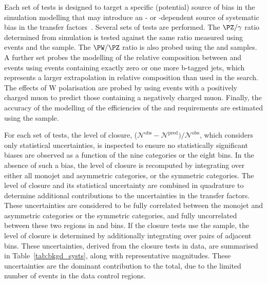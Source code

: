 Each set of tests is designed to target a specific (potential) source
of bias in the simulation modelling that may introduce an \njet- or
\scalht-dependent source of systematic bias in the transfer
factors~\cite{RA1Paper2012}. Several sets of tests are performed. The
$\PZ/\gamma$ ratio determined from simulation is tested against the
same ratio measured using \zmumuj events and the \gj sample. The
$\PW/\PZ$ ratio is also probed using the \mj and \mmj samples. A
further set probes the modelling of the relative composition between
\wjets and \ttbar events using \mj events containing exactly zero or
one more b-tagged jets, which represents a larger extrapolation in
relative composition than used in the search.  The effects of W
polarisation are probed by using \mj events with a positively charged
muon to predict those containing a negatively charged muon. Finally,
the accuracy of the modelling of the efficiencies of the \alphat and
\bdphi requirements are estimated using the \mj sample.

For each set of tests, the level of closure, %
($\mathcal{N}^\text{obs} - \mathcal{N}^\text{pred}) /
\mathcal{N}^\text{obs}$, which considers only statistical
uncertainties, is inspected to ensure no statistically significant
biases are observed as a function of the nine \njet categories or the
eight \scalht bins. In the absence of such a bias, the level of
closure is recomputed by integrating over either all monojet and
asymmetric \njet categories, or the symmetric \njet categories. The
level of closure and its statistical uncertainty are combined in
quadrature to determine additional contributions to the uncertainties
in the transfer factors. These uncertainties are considered to be
fully correlated between the monojet and asymmetric \njet categories
or the symmetric \njet categories, and fully uncorrelated between
these two regions in \njet and \scalht bins. If the closure tests use
the \mmj sample, the level of closure is determined by additionally
integrating over pairs of adjacent \scalht bins. These uncertainties,
derived from the closure tests in data, are summarised in
Table~\ref{tab:bkgd_systs}, along with representative
magnitudes. These uncertainties are the dominant contribution to the
total, due to the limited number of events in the data control
regions.




